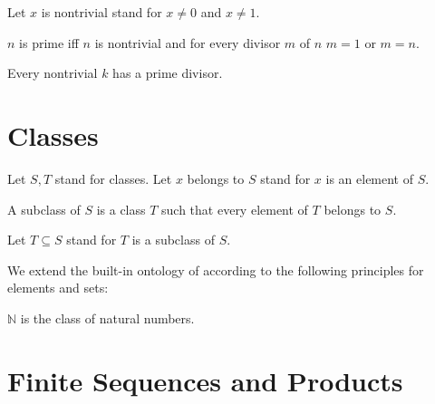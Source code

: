 \documentclass[11pt]{article}
\begin{document}
\begin{forthel}

Let $x$ is nontrivial stand for $x \neq 0$ and $x \neq 1$.

\begin{definition}
$n$ is prime iff $n$ is nontrivial and
    for every divisor $m$ of $n$ $m = 1$ or $m = n$.
\end{definition}

\begin{lemma} Every nontrivial $k$ has a prime divisor.
\end{lemma}

\end{forthel}

\section{Classes}

\begin{forthel}

Let $S,T$ stand for classes.
Let $x$ belongs to $S$ stand 
for $x$ is an element of $S$.

\begin{definition} A subclass of $S$ is a class $T$ 
such that every element of $T$ belongs to $S$.
\end{definition}

Let $T \subseteq S$ stand for $T$ is a subclass of $S$.
\end{forthel}

We extend the built-in ontology of \Naproche{}
according to the following principles for elements and sets:
\begin{forthel}

\begin{definition} $\mathbb{N}$ is the 
class of natural numbers.
\end{definition}

\end{forthel}

\section{Finite Sequences and Products}
\end{document}
